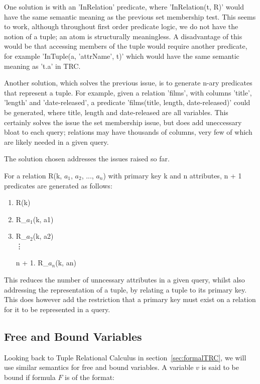 \documentclass[a4paper, 11pt]{article}
\begin{document}
      One solution is with an 'InRelation' predicate, where 'InRelation(t, R)'
      would have the same semantic meaning as the previous set membership test.
      This seems to work, although throughout first order predicate logic, we
      do not have the notion of a tuple; an atom is structurally meaningless. A
      disadvantage of this would be that accessing members of the tuple would
      require another predicate, for example 'InTuple(a, 'attrName', t)' which
      would have the same semantic meaning as 't.a' in TRC.

      Another solution, which solves the previous issue, is to generate n-ary
      predicates that represent a tuple. For example, given a relation 'films',
      with columns 'title', 'length' and 'date-released', a predicate
      'films(title, length, date-released)' could be generated, where title,
      length and date-released are all variables. This certainly solves the
      issue the set membership issue, but does add uneccessary bloat to each
      query; relations may have thousands of columns, very few of which are
      likely needed in a given query.

      The solution chosen addresses the issues raised so far.

      For a relation R(k, $a_{1}$, $a_{2}$, ..., $a_{n}$) with primary key k
      and n attributes, n + 1 predicates are generated as follows:
      \begin{enumerate}
        \item R(k)
        \item R\_$a_{1}$(k, a1)
        \item R\_$a_{2}$(k, a2)
        \\ \vdots
        \item[n + 1.] R\_$a_{n}$(k, an)
      \end{enumerate}

      This reduces the number of unncessary attributes in a given query, whilst
      also addressing the representation of a tuple, by relating a tuple to its
      primary key. This does however add the restriction that a primary key
      must exist on a relation for it to be represented in a query.

    \subsection{Free and Bound Variables}

      Looking back to Tuple Relational Calculus in
      section~\ref{sec:formalTRC}, we will use similar semantics for free and
      bound variables. A variable $v$ is said to be bound if formula $F$ is of
      the format:
\end{document}
